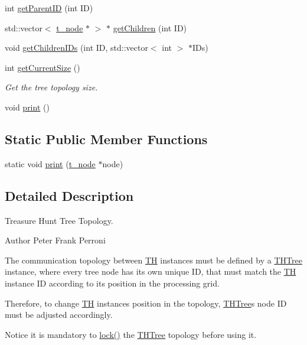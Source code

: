 \begin{DoxyCompactItemize}
\item 
int \hyperlink{classTHTree_a6c74633149823f9a6a7ecec871e046d0}{get\+Parent\+ID} (int ID)
\item 
std\+::vector$<$ \hyperlink{structt__node}{t\+\_\+node} $\ast$ $>$ $\ast$ \hyperlink{classTHTree_ae06947b1148e37c9ffd60081f190be31}{get\+Children} (int ID)
\item 
void \hyperlink{classTHTree_a8f5c9a86c21356c7072981e7fda37459}{get\+Children\+I\+Ds} (int ID, std\+::vector$<$ int $>$ $\ast$I\+Ds)
\item 
int \hyperlink{classTHTree_a13af8833607e6a6968d77c2a142e7c6f}{get\+Current\+Size} ()
\begin{DoxyCompactList}\small\item\em Get the tree topology size. \end{DoxyCompactList}\item 
void \hyperlink{classTHTree_afeb65f2df9bf539f4ca705eca32411f8}{print} ()
\end{DoxyCompactItemize}
\subsection*{Static Public Member Functions}
\begin{DoxyCompactItemize}
\item 
static void \hyperlink{classTHTree_aa98e891ad17c97426d77a80914dfd775}{print} (\hyperlink{structt__node}{t\+\_\+node} $\ast$node)
\end{DoxyCompactItemize}


\subsection{Detailed Description}
Treasure Hunt Tree Topology. 

\begin{DoxyAuthor}{Author}
Peter Frank Perroni
\end{DoxyAuthor}
The communication topology between \hyperlink{classTH}{TH} instances must be defined by a \hyperlink{classTHTree}{T\+H\+Tree} instance, where every tree node has its own unique ID, that must match the \hyperlink{classTH}{TH} instance ID according to its position in the processing grid.

Therefore, to change \hyperlink{classTH}{TH} instance\textquotesingle{}s position in the topology, \hyperlink{classTHTree}{T\+H\+Tree}\textquotesingle{}s node ID must be adjusted accordingly.

Notice it is mandatory to \hyperlink{classTHTree_a839ab9db010c87b20c1ba76a79f71b70}{lock()} the \hyperlink{classTHTree}{T\+H\+Tree} topology before using it. 

